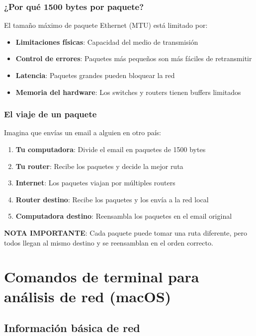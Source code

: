 \begin{itemize}
\subsubsection{¿Por qué 1500 bytes por paquete?}

El tamaño máximo de paquete Ethernet (MTU) está limitado por:

\begin{itemize}
    \item \textbf{Limitaciones físicas}: Capacidad del medio de transmisión
    \item \textbf{Control de errores}: Paquetes más pequeños son más fáciles de retransmitir
    \item \textbf{Latencia}: Paquetes grandes pueden bloquear la red
    \item \textbf{Memoria del hardware}: Los switches y routers tienen buffers limitados
\end{itemize}

\subsubsection{El viaje de un paquete}

Imagina que envías un email a alguien en otro país:

\begin{enumerate}
    \item \textbf{Tu computadora}: Divide el email en paquetes de 1500 bytes
    \item \textbf{Tu router}: Recibe los paquetes y decide la mejor ruta
    \item \textbf{Internet}: Los paquetes viajan por múltiples routers
    \item \textbf{Router destino}: Recibe los paquetes y los envía a la red local
    \item \textbf{Computadora destino}: Reensambla los paquetes en el email original
\end{enumerate}

\textbf{NOTA IMPORTANTE}: Cada paquete puede tomar una ruta diferente, pero todos llegan al mismo destino y se reensamblan en el orden correcto.

\section{Comandos de terminal para análisis de red (macOS)}

\subsection{Información básica de red}


\end{itemize}
